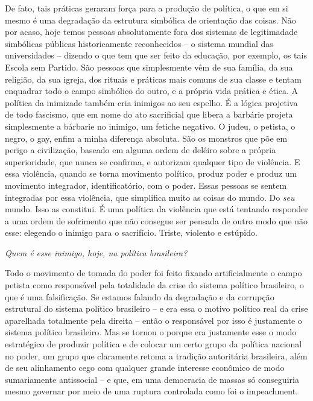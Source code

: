 De fato, tais práticas geraram força para a produção de política, o que
em si mesmo é uma degradação da estrutura simbólica de orientação das
coisas. Não por acaso, hoje temos pessoas absolutamente fora dos
sistemas de legitimadade simbólicas públicas historicamente reconhecidos
-- o sistema mundial das universidades -- dizendo o que tem que ser
feito da educação, por exemplo, os tais Escola sem Partido. São pessoas
que simplesmente vêm de sua família, da sua religião, da sua igreja, dos
rituais e práticas mais comuns de sua classe e tentam enquadrar todo o
campo simbólico do outro, e a própria vida prática e ética. A política
da inimizade também cria inimigos ao seu espelho. É a lógica projetiva
de todo fascismo, que em nome do ato sacrificial que libera a barbárie
projeta simplesmente a bárbarie no inimigo, um fetiche negativo. O
judeu, o petista, o negro, o gay, enfim a minha diferença absoluta. São
os monstros que põe em perigo a civilização, baseado em alguma ordem de
deléiro sobre a própria superioridade, que nunca se confirma, e
autorizam qualquer tipo de violência. E essa violência, quando se torna
movimento político, produz poder e produz um movimento integrador,
identificatório, com o poder. Essas pessoas se sentem integradas por
essa violência, que simplifica muito as coisas do mundo. Do \emph{seu}
mundo. Isso as constitui. É uma política da violência que está tentando
responder a uma ordem de sofrimento que não consegue ser pensada de
outro modo que não esse: elegendo o inimigo para o sacrifício. Triste,
violento e estúpido.

\medskip

\noindent\emph{Quem é esse inimigo, hoje, na política brasileira?}

\noindent Todo o movimento de tomada do poder foi feito fixando artificialmente o
campo petista como responsável pela totalidade da crise do sistema
político brasileiro, o que é uma falsificação. Se estamos falando da
degradação e da corrupção estrutural do sistema político brasileiro -- e
era essa o motivo político real da crise aparelhada totalmente pela
direita -- então o responsável por isso é justamente o sistema político
brasileiro. Mas se tornou o  porque era justamente esse o modo
estratégico de produzir política e de colocar um certo grupo da política
nacional no poder, um grupo que claramente retoma a tradição autoritária
brasileira, além de seu alinhamento cego com qualquer grande interesse
econômico de modo sumariamente antissocial -- e que, em uma democracia
de massas só conseguiria mesmo governar por meio de uma ruptura
controlada como foi o impeachment.

